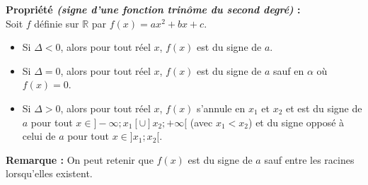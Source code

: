 \documentclass[11pt,a4paper]{article}
\begin{document}
\begin{mdframed}[style=proprieteStyle]
	\textbf{Propriété \emph{(signe d'une fonction trinôme du second degré)} :} ~\\
	Soit $f$ définie sur $\mathbb{R}$ par $f(x)=ax^2+bx+c$.
	\vspace{-6pt}
	\begin{itemize}
		\item Si $\Delta<0$, alors pour tout réel $x$, $f(x)$ est du signe de $a$.
		\item Si $\Delta=0$, alors pour tout réel $x$, $f(x)$ est du signe de $a$ sauf en $\alpha$ où $f(x)=0$.
		\item Si $\Delta>0$, alors pour tout réel $x$, $f(x)$ s'annule en $x_1$ et $x_2$ et est du signe de $a$ pour
		      tout $x\in]-\infty;x_1[\cup]x_2;+\infty[$ (avec $x_1<x_2$) et du signe opposé à celui de $a$ pour tout $x\in]x_1;x_2[$.
	\end{itemize}
\end{mdframed}
\textbf{Remarque :} On peut retenir que $f(x)$ est du signe de $a$ sauf entre les racines lorsqu'elles existent.
\end{document}
